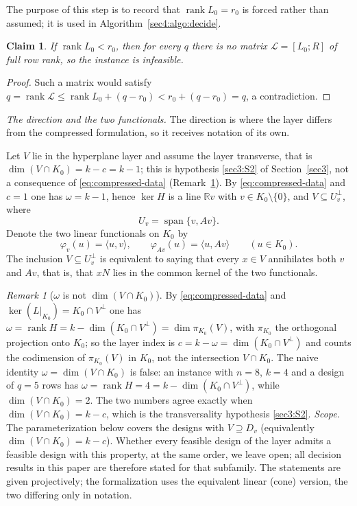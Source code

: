 \documentclass[journal]{IEEEtran}
\theoremstyle{plainn}
\newtheorem{claim}{Claim}
\theoremstyle{remark}
\newtheorem{remark}{Remark}
\newcommand{\rank}{\operatorname{rank}}
\begin{document}
The purpose of this step is to record that $\rank L_0=r_0$ is forced rather than assumed; it is used
in Algorithm~\ref{sec4:algo:decide}.

\begin{claim}
  \label{prop:rankprecheck}
  If $\rank L_0<r_0$, then for every $q$ there is no matrix $\mathcal L=[L_0;R]$ of full row rank, so
  the instance is infeasible.
\end{claim}

\begin{proof}
  Such a matrix would satisfy
  $q=\rank\mathcal L\le\rank L_0+(q-r_0)<r_0+(q-r_0)=q$, a contradiction.
\end{proof}


\emph{The direction and the two functionals.} The direction is where the layer differs from the
compressed formulation, so it receives notation of its own.

Let $V$ lie in the hyperplane layer and assume the layer transverse, that is
$\dim(V\cap K_0)=k-c=k-1$; this is hypothesis \ref{sec3:S2} of Section~\ref{sec3}, not a consequence of
\eqref{eq:compressed-data} (Remark~\ref{sec3:rem:identity}). By \eqref{eq:compressed-data} and $c=1$ one
has $\omega=k-1$, hence $\ker H$ is a line $\mathbb R v$ with $v\in K_0\setminus\{0\}$, and
$V\subseteq U_v^\perp$, where
\begin{equation}
  \label{eq:Uv}
  U_v=\operatorname{span}\{v,Av\}.
\end{equation}
Denote the two linear functionals on $K_0$ by
\begin{equation}
  \label{eq:functionals}
  \varphi_v(u)=\langle u,v\rangle,\qquad \varphi_{Av}(u)=\langle u,Av\rangle
  \qquad(u\in K_0).
\end{equation}
The inclusion $V\subseteq U_v^\perp$ is equivalent to saying that every $x\in V$ annihilates both $v$
and $Av$, that is, that $xN$ lies in the common kernel of the two functionals.

\begin{remark}[$\omega$ is not $\dim(V\cap K_0)$]\label{sec3:rem:identity}
By \eqref{eq:compressed-data} and $\ker(L|_{K_0})=K_0\cap V^\perp$ one has
$\omega=\rank H=k-\dim(K_0\cap V^\perp)=\dim\pi_{K_0}(V)$, with $\pi_{K_0}$ the orthogonal projection
onto $K_0$; so the layer index is
$c=k-\omega=\dim(K_0\cap V^\perp)$ and counts the codimension of $\pi_{K_0}(V)$ in $K_0$, not the
intersection $V\cap K_0$. The naive identity $\omega=\dim(V\cap K_0)$ is false: an instance with $n=8$,
$k=4$ and a design of $q=5$ rows has $\omega=\rank H=4=k-\dim(K_0\cap V^\perp)$, while
$\dim(V\cap K_0)=2$. The two numbers agree exactly when $\dim(V\cap K_0)=k-c$, which is the
transversality hypothesis \ref{sec3:S2}.
 \emph{Scope.} The parameterization below covers the designs with $V\supseteq D_v$ (equivalently $\dim(V\cap K_0)=k-c$). Whether every feasible design of the layer admits a feasible design with this property, at the same order, we leave open; all decision results in this paper are therefore stated for that subfamily. The statements are given projectively; the formalization uses the equivalent linear (cone) version, the two differing only in notation.
\end{remark}
\end{document}
